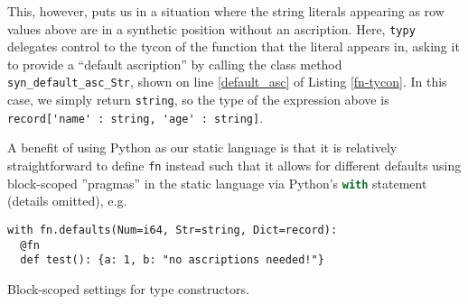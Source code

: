 \documentclass{sigplanconf}
\newcommand{\lip}[1]{\lstinline[language=Python,basicstyle=\ttfamily\small,deletendkeywords={tuple,buffer,map}]{#1}}
\begin{document}
This, however, puts us in a situation where the string literals appearing as row values above are in a synthetic position without an ascription. Here, \lip{typy} delegates control to the tycon of the function that the literal appears in, asking it to provide a ``default ascription'' by calling the class method \lip{syn_default_asc_Str}, shown on line \ref{default_asc} of Listing \ref{fn-tycon}. In this case, we simply return \lip{string}, so the type of the expression above is \lstinline[basicstyle=\ttfamily\small]{record['name' : string, 'age' : string]}. 

A benefit of using Python as our static language is that it is relatively straightforward to define \lip{fn} instead such that it allows for different defaults using block-scoped ''pragmas'' in the static language via Python's \lip{with} statement \cite{python} (details omitted), e.g. 
\begin{codelisting}[h]
\begin{lstlisting}[numbers=none]
with fn.defaults(Num=i64, Str=string, Dict=record):
  @fn
  def test(): {a: 1, b: "no ascriptions needed!"} 
\end{lstlisting}
\caption{Block-scoped settings for type constructors.}
\label{defaultasc}
\end{codelisting}
\vspace{-10px}

\end{document}
